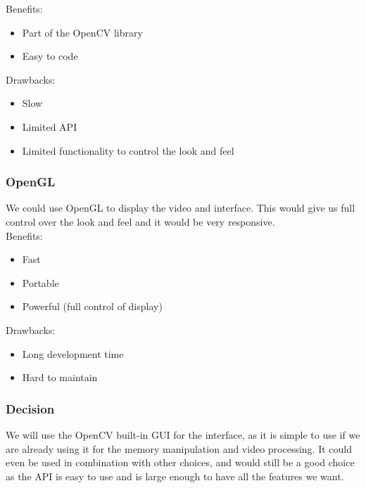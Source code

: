 	Benefits:
	\begin{itemize}[leftmargin=2cm,labelindent=2cm]
		\item Part of the OpenCV library
		\item Easy to code
	\end{itemize}
	
	Drawbacks:
	\begin{itemize}[leftmargin=2cm,labelindent=2cm]
		\item Slow
		\item Limited API
		\item Limited functionality to control the look and feel\\
	\end{itemize}
	
	\subsubsection{OpenGL}
	We could use OpenGL to display the video and interface. This would give us full control over the look and feel and it would be very responsive.\\
		
	Benefits:
	\begin{itemize}[leftmargin=2cm,labelindent=2cm]
		\item Fast
		\item Portable
		\item Powerful (full control of display)
	\end{itemize}
	
	Drawbacks:
	\begin{itemize}[leftmargin=2cm,labelindent=2cm]
		\item Long development time
		\item Hard to maintain\\
	\end{itemize}
	
	\subsubsection{Decision}
	We will use the OpenCV built-in GUI for the interface, as it is simple to use if we are already using it for the memory manipulation and video processing. It could even be used in combination with other choices, and would still be a good choice as the API is easy to use and is large enough to have all the features we want.
